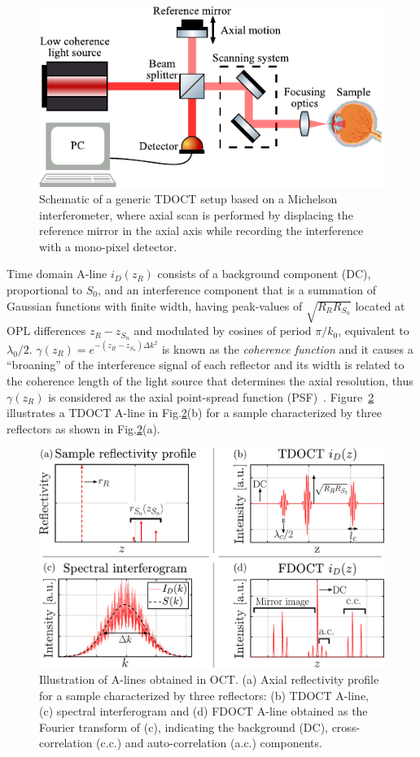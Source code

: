 \begin{figure}[htb!]
    \centering
    \includegraphics[width=.7\textwidth]{Figures/TheoreticalBasis/TDOCT_Scheme.pdf}
    \caption[Schematic of a generic TDOCT setup based on a Michelson interferometer.]{Schematic of a generic TDOCT setup based on a Michelson interferometer, where axial scan is performed by displacing the reference mirror in the axial axis while recording the interference with a mono-pixel detector.}
    \label{fig:TDOCT_Scheme}
\end{figure}

Time domain A-line $i_D(z_R)$ consists of a background component (DC), proportional to $S_0$, and an interference component that is a summation of Gaussian functions with finite width, having peak-values of $\sqrt{R_RR_{S_n}}$ located at OPL differences $z_R-z_{S_n}$ and modulated by cosines of period $\pi/k_0$, equivalent to $\lambda_0/2$. $\gamma(z_R)=e^{-(z_R-z_{S_n})\Delta k^2}$ is known as the \textit{coherence function} and it causes a ``broaning'' of the interference signal of each reflector and its width is related to the coherence length of the light source that determines the axial resolution, thus $\gamma(z_R)$ is considered as the axial point-spread function (PSF)~\cite{Izatt2015_Theory}. Figure~\ref{fig:Alines} illustrates a TDOCT A-line in Fig.\ref{fig:Alines}(b) for a sample characterized by three reflectors as shown in Fig.\ref{fig:Alines}(a).

\begin{figure}[htb!]
    \centering
    \includegraphics[width=.7\textwidth]{Figures/TheoreticalBasis/Alines.pdf}
    \caption[Illustration of A-lines obtained in OCT.]{Illustration of A-lines obtained in OCT. (a) Axial reflectivity profile for a sample characterized by three reflectors: (b) TDOCT A-line, (c) spectral interferogram and (d) FDOCT A-line obtained as the Fourier transform of (c), indicating the background (DC), cross-correlation (c.c.) and auto-correlation (a.c.) components.}
    \label{fig:Alines}
\end{figure}

